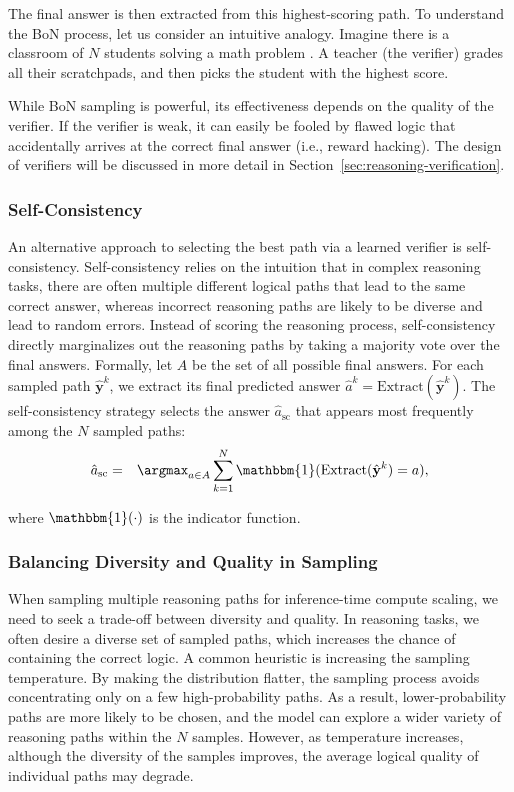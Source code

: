 \noindent The final answer is then extracted from this highest-scoring path.  To understand the BoN process, let us consider an intuitive analogy. Imagine there is a classroom of $N$ students solving a math problem	. A teacher (the verifier) grades all their scratchpads, and then picks the student with the highest score.

While BoN sampling is powerful, its effectiveness depends on the quality of the verifier. If the verifier is weak, it can easily be fooled by flawed logic that accidentally arrives at the correct final answer (i.e., reward hacking). The design of verifiers will be discussed in more detail in Section~\ref{sec:reasoning-verification}.

\subsubsection{Self-Consistency}
An alternative approach to selecting the best path via a learned verifier is self-consistency. Self-consistency relies on the intuition that in complex reasoning tasks, there are often multiple different logical paths that lead to the same correct answer, whereas incorrect reasoning paths are likely to be diverse and lead to random errors. Instead of scoring the reasoning process, self-consistency directly marginalizes out the reasoning paths by taking a majority vote over the final answers. Formally, let $A$ be the set of all possible final answers. For each sampled path $\hat{\mathbf{y}}^k$, we extract its final predicted answer $\hat{a}^k = \mathrm{Extract}(\hat{\mathbf{y}}^k)$. The self-consistency strategy selects the answer $\hat{a}_{\mathrm{sc}}$ that appears most frequently among the $N$ sampled paths:
\begin{eqnarray}
\hat{a}_{\mathrm{sc}} & = & \argmax_{a \in A} \sum_{k=1}^N \mathbbm{1}(\mathrm{Extract}(\hat{\mathbf{y}}^k) = a),
\end{eqnarray}

\noindent where $\mathbbm{1}(\cdot)$ is the indicator function.

\subsubsection{Balancing Diversity and Quality in Sampling}

When sampling multiple reasoning paths for inference-time compute scaling, we need to seek a trade-off between diversity and quality. In reasoning tasks, we often desire a diverse set of sampled paths, which increases the chance of containing the correct logic. A common heuristic is increasing the sampling temperature. By making the distribution flatter, the sampling process avoids concentrating only on a few high-probability paths. As a result, lower-probability paths are more likely to be chosen, and the model can explore a wider variety of reasoning paths within the $N$ samples. However, as temperature increases, although the diversity of the samples improves, the average logical quality of individual paths may degrade.

